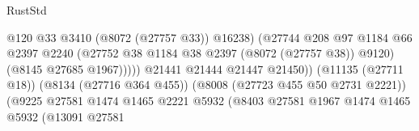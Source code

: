 \begin{lexlean}{RustStd}
\begin{coremodule}
{\begin{coremodule}
{{{{{{{{{{{{{{{{{{{{{{{{{{{{{{{{{{{{{{{{{{{{{{{{{{{{{                                                            @120
                                                            @33
                                                            @3410
                                                            (@8072 (@27757 @33))
                                                            @16238)
                                                          (@27744
                                                            @208
                                                            @97
                                                            @1184
                                                            @66
                                                            @2397
                                                            @2240
                                                            (@27752
                                                              @38
                                                              @1184
                                                              @38
                                                              @2397
                                                              (@8072 (@27757 @38))
                                                              @9120)
                                                            (@8145 @27685 @1967)))))
                                                    @21441
                                                    @21444
                                                    @21447
                                                    @21450))
                                                (@11135 (@27711 @18))
                                                (@8134 (@27716 @364 @455))
                                                (@8008 (@27723 @455 @50 @2731 @2221))
                                                (@9225
                                                  @27581
                                                  @1474
                                                  @1465
                                                  @2221
                                                  @5932
                                                  (@8403
                                                    @27581
                                                    @1967
                                                    @1474
                                                    @1465
                                                    @5932
                                                    (@13091
                                                      @27581
}}}}}}}}}}}}}}}}}}}}}}}}}}}}}}}}}}}}}}}}}}}}}}}}}}}}}
\end{coremodule}}
\end{coremodule}
\end{lexlean}
